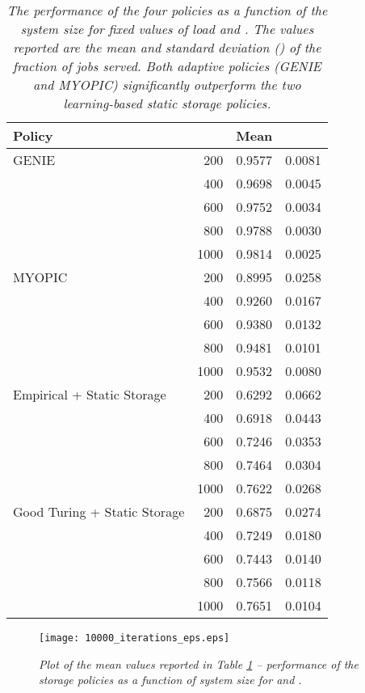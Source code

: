 \documentclass[10pt, conference, letterpaper]{IEEEtran}
\begin{document}
\begin{table}[h]
	
	\centering
	\begin{tabular}{l r c c }
		\hline\hline
		Policy &  & Mean &  \\ [0.5ex] \hline GENIE & 200 & 0.9577 & 0.0081  \\
		& 400 & 0.9698 & 0.0045 \\
		& 600 & 0.9752 & 0.0034 \\
		& 800 & 0.9788 & 0.0030 \\
		& 1000 & 0.9814 & 0.0025 \\
		\hline
		MYOPIC & 200 & 0.8995  & 0.0258 \\
		& 400 & 0.9260  & 0.0167  \\
		& 600 & 0.9380  & 0.0132 \\
		& 800 & 0.9481  & 0.0101 \\
		& 1000 & 0.9532 & 0.0080 \\
		\hline
		Empirical + Static Storage & 200 & 0.6292 & 0.0662  \\
		& 400 & 0.6918 & 0.0443 \\
		& 600 & 0.7246 & 0.0353 \\
		& 800 & 0.7464 & 0.0304 \\
		& 1000 & 0.7622 & 0.0268 \\
		\hline
		Good Turing + Static Storage & 200 & 0.6875 & 0.0274  \\
		& 400 & 0.7249 & 0.0180  \\
		& 600 & 0.7443 & 0.0140 \\
		& 800 & 0.7566 & 0.0118 \\
		& 1000 & 0.7651 & 0.0104 \\
		\hline
	\end{tabular}
	\caption{\sl The performance of the four policies as a function of the system size  for fixed values of load  and . The values reported are the mean and standard deviation () of the fraction of jobs served. Both adaptive policies (GENIE and MYOPIC) significantly outperform the two learning-based static storage policies.}
	
	\label{table:diff_n} \end{table}

\begin{figure}[h]
	\begin{center}
		\texttt{[image: 10000\_iterations\_eps.eps]}
		\caption{\sl Plot of the mean values reported in Table \ref{table:diff_n} -- performance of the storage policies as a function of system size  for  and . \label{fig:diff_n}}
	\end{center}
\end{figure}
\end{document}
